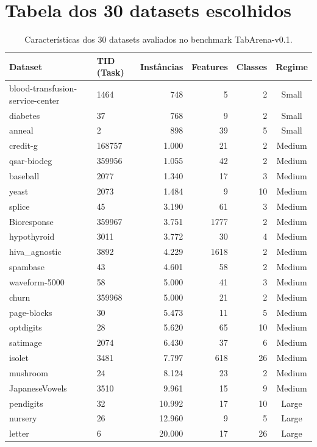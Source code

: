 \documentclass[12pt,a4paper]{article}
\begin{document}
\section{Tabela dos 30 datasets escolhidos}
\begin{table}[htpb]
\centering
\small
\caption{Características dos 30 datasets avaliados no benchmark TabArena-v0.1.}
\label{tab:datasets}
\vspace{0.2cm}
\begin{tabular}{@{}llrrrc@{}}
\toprule
\textbf{Dataset} & \textbf{TID (Task)} & \textbf{Instâncias} & \textbf{Features} & \textbf{Classes} & \textbf{Regime} \\ \midrule
blood-transfusion-service-center & 1464 & 748 & 5 & 2 & Small \\
diabetes & 37 & 768 & 9 & 2 & Small \\
anneal & 2 & 898 & 39 & 5 & Small \\
credit-g & 168757 & 1.000 & 21 & 2 & Medium \\
qsar-biodeg & 359956 & 1.055 & 42 & 2 & Medium \\
baseball & 2077 & 1.340 & 17 & 3 & Medium \\
yeast & 2073 & 1.484 & 9 & 10 & Medium \\
splice & 45 & 3.190 & 61 & 3 & Medium \\
Bioresponse & 359967 & 3.751 & 1777 & 2 & Medium \\
hypothyroid & 3011 & 3.772 & 30 & 4 & Medium \\
hiva\_agnostic & 3892 & 4.229 & 1618 & 2 & Medium \\
spambase & 43 & 4.601 & 58 & 2 & Medium \\
waveform-5000 & 58 & 5.000 & 41 & 3 & Medium \\
churn & 359968 & 5.000 & 21 & 2 & Medium \\
page-blocks & 30 & 5.473 & 11 & 5 & Medium \\
optdigits & 28 & 5.620 & 65 & 10 & Medium \\
satimage & 2074 & 6.430 & 37 & 6 & Medium \\
isolet & 3481 & 7.797 & 618 & 26 & Medium \\
mushroom & 24 & 8.124 & 23 & 2 & Medium \\
JapaneseVowels & 3510 & 9.961 & 15 & 9 & Medium \\
pendigits & 32 & 10.992 & 17 & 10 & Large \\
nursery & 26 & 12.960 & 9 & 5 & Large \\
letter & 6 & 20.000 & 17 & 26 & Large \\

\end{tabular}
\end{table}
\end{document}
